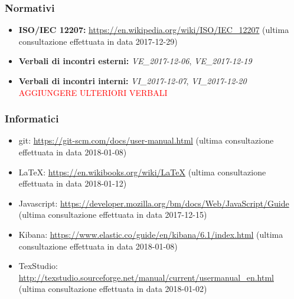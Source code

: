 	\subsubsection{Normativi}
		\begin{itemize}
			\item \textbf{ISO/IEC 12207:} \href{https://en.wikipedia.org/wiki/ISO/IEC\_12207}{https://en.wikipedia.org/wiki/ISO/IEC\_12207} (ultima consultazione effettuata in data 2017-12-29)
			\item \textbf{Verbali di incontri esterni:} \emph{VE\_2017-12-06}, \emph{VE\_2017-12-19}
			\item \textbf{Verbali di incontri interni:}	\emph{VI\_2017-12-07}, \emph{VI\_2017-12-20}
			\textcolor{red}{AGGIUNGERE ULTERIORI VERBALI}	
		\end{itemize}
	\subsubsection{Informatici}
	\begin{itemize}
		\item git:
		\href{https://git-scm.com/docs/user-manual.html}{https://git-scm.com/docs/user-manual.html} (ultima consultazione effettuata in data 2018-01-08)
		
		\item \LaTeX:  \href{https://en.wikibooks.org/wiki/LaTeX}{https://en.wikibooks.org/wiki/LaTeX} (ultima consultazione effettuata in data 2018-01-12)
		
		\item Javascript:
		\href{https://developer.mozilla.org/bm/docs/Web/JavaScript/Guide}{https://developer.mozilla.org/bm/docs/Web/JavaScript/Guide} (ultima consultazione effettuata in data 2017-12-15)
		
		\item Kibana: \href{https://www.elastic.co/guide/en/kibana/6.1/index.html}{https://www.elastic.co/guide/en/kibana/6.1/index.html} (ultima consultazione effettuata in data 2018-01-08)
		
		\item TexStudio: 
		\href{http://texstudio.sourceforge.net/manual/current/usermanual\_en.html}{http://texstudio.sourceforge.net/manual/current/usermanual\_en.html} (ultima consultazione effettuata in data 2018-01-02)
	\end{itemize}
	